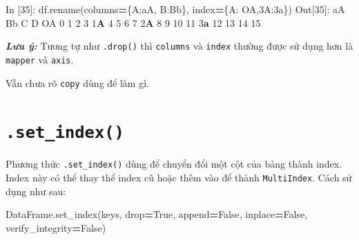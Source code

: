 \documentclass[
]{book}
\makeatletter
\newenvironment{Shaded}{\begin{snugshade}}{\end{snugshade}}
\newcommand{\DecValTok}[1]{\textcolor[rgb]{0.00,0.00,0.81}{#1}}
\newcommand{\ErrorTok}[1]{\textcolor[rgb]{0.64,0.00,0.00}{\textbf{#1}}}
\newcommand{\NormalTok}[1]{#1}
\newcommand{\OperatorTok}[1]{\textcolor[rgb]{0.81,0.36,0.00}{\textbf{#1}}}
\newcommand{\StringTok}[1]{\textcolor[rgb]{0.31,0.60,0.02}{#1}}
\newcommand{\VariableTok}[1]{\textcolor[rgb]{0.00,0.00,0.00}{#1}}
\newenvironment{kframe}{%
\medskip{}
\setlength{\fboxsep}{.8em}
 \def\at@end@of@kframe{}%
 \ifinner\ifhmode%
  \def\at@end@of@kframe{\end{minipage}}%
  \begin{minipage}{\columnwidth}%
 \fi\fi%
 \def\FrameCommand##1{\hskip\@totalleftmargin \hskip-\fboxsep
 \colorbox{shadecolor}{##1}\hskip-\fboxsep
     \hskip-\linewidth \hskip-\@totalleftmargin \hskip\columnwidth}%
 \MakeFramed {\advance\hsize-\width
   \@totalleftmargin\z@ \linewidth\hsize
   \@setminipage}}%
 {\par\unskip\endMakeFramed%
 \at@end@of@kframe}
\newenvironment{rmdblock}[1]
  {
  \begin{itemize}
  \renewcommand{\labelitemi}{
    \raisebox{-.7\height}[0pt][0pt]{
      {\setkeys{Gin}{width=3em,keepaspectratio}\texttt{[image: images/\#1]}}
    }
  }
  \setlength{\fboxsep}{1em}
  \begin{kframe}
  \item
  }
  {
  \end{kframe}
  \end{itemize}
  }
\newenvironment{rmdnote}
  {\begin{rmdblock}{note}}
  {\end{rmdblock}}
\makeatother
\begin{document}
\begin{Shaded}
\begin{Highlighting}[]
\NormalTok{In [}\DecValTok{35}\NormalTok{]: df.rename(columns}\OperatorTok{=}\NormalTok{\{}\StringTok{\textquotesingle{}A\textquotesingle{}}\NormalTok{:}\StringTok{\textquotesingle{}aA\textquotesingle{}}\NormalTok{, }\StringTok{\textquotesingle{}B\textquotesingle{}}\NormalTok{:}\StringTok{\textquotesingle{}Bb\textquotesingle{}}\NormalTok{\}, index}\OperatorTok{=}\NormalTok{\{}\StringTok{\textquotesingle{}A\textquotesingle{}}\NormalTok{: }\StringTok{\textquotesingle{}OA\textquotesingle{}}\NormalTok{,}\StringTok{\textquotesingle{}3A\textquotesingle{}}\NormalTok{:}\StringTok{\textquotesingle{}3a\textquotesingle{}}\NormalTok{\})}
\NormalTok{Out[}\DecValTok{35}\NormalTok{]:}
\NormalTok{    aA  Bb   C   D}
\NormalTok{OA   }\DecValTok{0}   \DecValTok{1}   \DecValTok{2}   \DecValTok{3}
\DecValTok{1}\ErrorTok{A}   \DecValTok{4}   \DecValTok{5}   \DecValTok{6}   \DecValTok{7}
\DecValTok{2}\ErrorTok{A}   \DecValTok{8}   \DecValTok{9}  \DecValTok{10}  \DecValTok{11}
\DecValTok{3}\ErrorTok{a}  \DecValTok{12}  \DecValTok{13}  \DecValTok{14}  \DecValTok{15}
\end{Highlighting}
\end{Shaded}

\begin{rmdnote}
\textbf{\emph{Lưu ý:}}
Tương tự như \texttt{.drop()} thì \texttt{columns} và \texttt{index} thường được sử dụng hơn là \texttt{mapper} và \texttt{axis}.

Vẫn chưa rõ \texttt{copy} dùng để làm gì.
\end{rmdnote}

\hypertarget{set_index}{%
\section{\texorpdfstring{\texttt{.set\_index()}}{.set\_index()}}\label{set_index}}

Phương thức \texttt{.set\_index()} dùng để chuyển đổi một cột của bảng thành index. Index này có thể thay thể index cũ hoặc thêm vào để thành \texttt{MultiIndex}. Cách sử dụng như sau:

\begin{Shaded}
\begin{Highlighting}[]
\NormalTok{DataFrame.set\_index(keys, drop}\OperatorTok{=}\VariableTok{True}\NormalTok{, append}\OperatorTok{=}\VariableTok{False}\NormalTok{, inplace}\OperatorTok{=}\VariableTok{False}\NormalTok{, verify\_integrity}\OperatorTok{=}\VariableTok{False}\NormalTok{)}
\end{Highlighting}
\end{Shaded}
\end{document}
